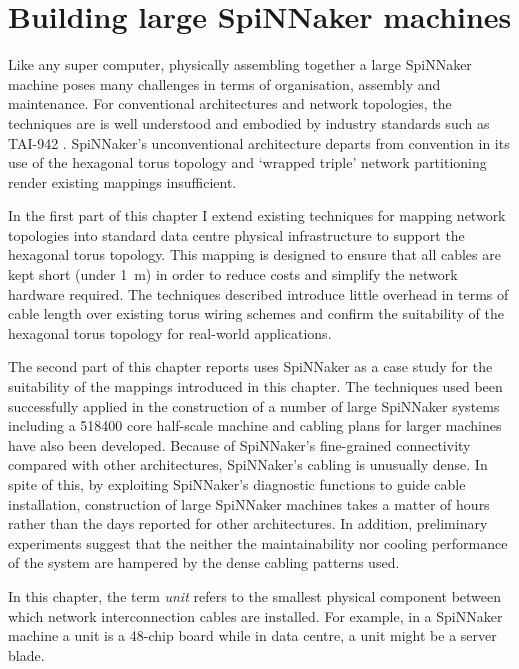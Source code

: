 \chapter{Building large SpiNNaker machines}
	
	Like any super computer, physically assembling together a large SpiNNaker
	machine poses many challenges in terms of organisation, assembly and
	maintenance. For conventional architectures and network topologies, the
	techniques are is well understood and embodied by industry standards such as
	TAI-942 \cite{tia2006}. SpiNNaker's unconventional architecture departs from
	convention in its use of the hexagonal torus topology and `wrapped triple'
	network partitioning render existing mappings insufficient.
	
	In the first part of this chapter I extend existing techniques for mapping
	network topologies into standard data centre physical infrastructure to
	support the hexagonal torus topology. This mapping is designed to ensure that
	all cables are kept short (under \SI{1}{\meter}) in order to reduce costs and
	simplify the network hardware required. The techniques described introduce
	little overhead in terms of cable length over existing torus wiring schemes
	and confirm the suitability of the hexagonal torus topology for real-world
	applications.
	
	The second part of this chapter reports uses SpiNNaker as a case study for
	the suitability of the mappings introduced in this chapter.  The techniques
	used been successfully applied in the construction of a number of large
	SpiNNaker systems including a \num{518400} core half-scale machine and
	cabling plans for larger machines have also been developed. Because of
	SpiNNaker's fine-grained connectivity compared with other architectures,
	SpiNNaker's cabling is unusually dense.  In spite of this, by exploiting
	SpiNNaker's diagnostic functions to guide cable installation, construction of
	large SpiNNaker machines takes a matter of hours rather than the days
	reported for other architectures. In addition, preliminary experiments
	suggest that the neither the maintainability nor cooling performance of the
	system are hampered by the dense cabling patterns used.
	
	In this chapter, the term \emph{unit} refers to the smallest physical
	component between which network interconnection cables are installed. For
	example, in a SpiNNaker machine a unit is a 48-chip board while in data
	centre, a unit might be a server blade.
	

